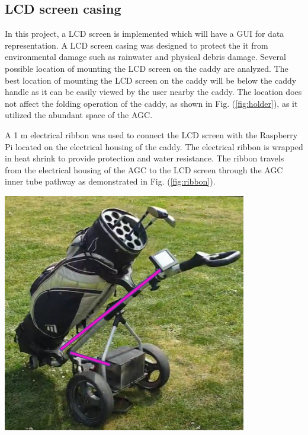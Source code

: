\documentclass[11pt,landscape]{article}
\newenvironment{Figure}
  {\par\medskip\noindent\minipage{\linewidth}}
  {\endminipage\par\medskip}
\begin{document}
\begin{multicols}{3}
    \subsection{LCD screen casing}
    In this project, a LCD screen is implemented which will have a GUI for data
    representation. A LCD screen casing was designed to protect the it from environmental damage such as rainwater and physical debris
    damage. Several possible location of mounting the LCD screen on the caddy are analyzed.
    The best location of mounting the LCD screen on the caddy will be
    below the caddy handle as it can be easily viewed by the user nearby
    the caddy. The location does not affect the folding operation of the caddy,
    as shown in Fig. (\ref{fig:holder}), as it utilized the abundant space of
    the AGC. 
 
    
    A 1 m electrical ribbon was used to connect the LCD screen with the
    Raspberry Pi located on the electrical housing of the caddy. The electrical
    ribbon is wrapped in heat shrink to provide protection and water
    resistance. The ribbon travels from the electrical housing of the AGC to
    the LCD screen through the AGC inner tube pathway as demonstrated in
     Fig. (\ref{fig:ribbon}).


    \begin{Figure}
        \begin{center}
            \includegraphics[width=0.8\textwidth]{Figure33.jpg}
            \label{fig:ribbon}
        \end{center}
    \end{Figure}
    

\end{multicols}
\end{document}
